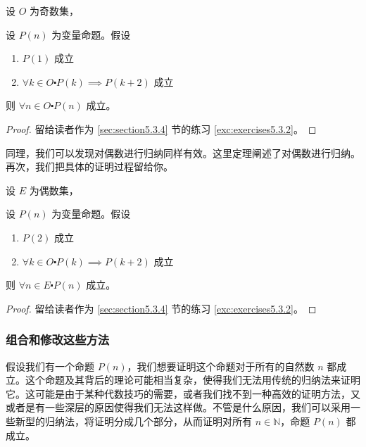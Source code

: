 \begin{theorem}[奇数上的归纳]\label{theorem5.3.5}
    设 $O$ 为奇数集，

    设 $P(n)$ 为变量命题。假设

    \begin{enumerate}[label=(\arabic*)]
        \item $P(1)$ 成立
        \item $\forall k \in O \centerdot P(k) \implies P(k + 2)$ 成立
    \end{enumerate}

    则 $\forall n \in O \centerdot P(n)$ 成立。
\end{theorem}

\begin{proof}
    留给读者作为 \ref{sec:section5.3.4} 节的练习 \ref{exc:exercises5.3.2}。
\end{proof}

同理，我们可以发现对偶数进行归纳同样有效。这里定理阐述了对偶数进行归纳。再次，我们把具体的证明过程留给你。

\begin{theorem}[偶数上的归纳]\label{theorem5.3.6}
    设 $E$ 为偶数集，

    设 $P(n)$ 为变量命题。假设

    \begin{enumerate}[label=(\arabic*)]
        \item $P(2)$ 成立
        \item $\forall k \in O \centerdot P(k) \implies P(k + 2)$ 成立
    \end{enumerate}

    则 $\forall n \in E \centerdot P(n)$ 成立。
\end{theorem}

\begin{proof}
    留给读者作为 \ref{sec:section5.3.4} 节的练习 \ref{exc:exercises5.3.2}。
\end{proof}


\subsubsection*{组合和修改这些方法}

假设我们有一个命题 $P(n)$，我们想要证明这个命题对于所有的自然数 $n$ 都成立。这个命题及其背后的理论可能相当复杂，使得我们无法用传统的归纳法来证明它。这可能是由于某种代数技巧的需要，或者我们找不到一种高效的证明方法，又或者是有一些深层的原因使得我们无法这样做。不管是什么原因，我们可以采用一些新型的归纳法，将证明分成几个部分，从而证明对所有 $n \in \mathbb{N}$，命题 $P(n)$ 都成立。


